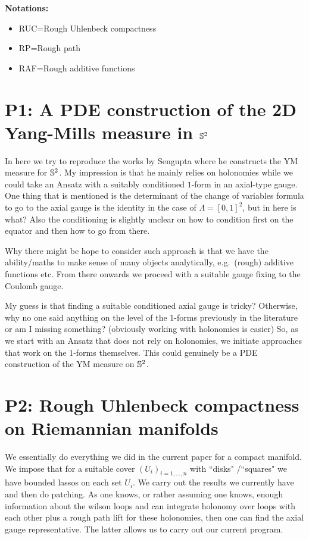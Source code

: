 \documentclass[./main.tex]{subfiles}
\begin{document}
\textbf{Notations:}
\begin{itemize}
    \item  RUC=Rough Uhlenbeck compactness
    \item RP=Rough path
    \item RAF=Rough additive functions
\end{itemize}


\section{P1: A PDE construction of the 2D Yang-Mills measure in $\mathbb S^2$}
In here we try to reproduce the works by Sengupta where he constructs the YM measure for $\mathbb S^2$. My impression is that he mainly relies on holonomies while we could take an Ansatz  with a suitably conditioned  $1$-form in an axial-type gauge. One thing that is mentioned is the determinant of the change of variables formula to go to the axial gauge is the identity in the case of $\Lambda=[0,1]^2$, but in here is what? Also the conditioning is slightly unclear on how to condition first on the equator and then how to go from there. 

Why there might be hope to consider such approach is that we have the ability/maths to make sense of many objects analytically, e.g.\ (rough) additive functions etc. From there onwards we proceed with a suitable gauge fixing to the Coulomb gauge. 

My guess is that finding a suitable conditioned axial gauge is tricky? Otherwise, why no one said anything on the level of the $1$-forms previously in the literature or am I missing something? (obviously working with holonomies is easier) So, as we start with an Ansatz that does not rely on holonomies, we initiate approaches that work on the $1$-forms themselves. This could genuinely be a PDE construction of the YM measure on $\mathbb S^2$. 


\section{P2: Rough Uhlenbeck compactness on Riemannian manifolds}
We essentially do everything we did in the current paper for a compact manifold. We impose that for a suitable cover $(U_i)_{i=1,...,n}$ with ``disks" /``squares" we have bounded lassos on each set $U_i$. We carry out the results we currently have and then do patching. As one knows, or rather assuming one knows, enough information about the wilson loops and can integrate holonomy over loops with each other plus a rough path lift for these holonomies, then one can find the axial gauge representative. The latter allows us to carry out our current program.  
\end{document}

